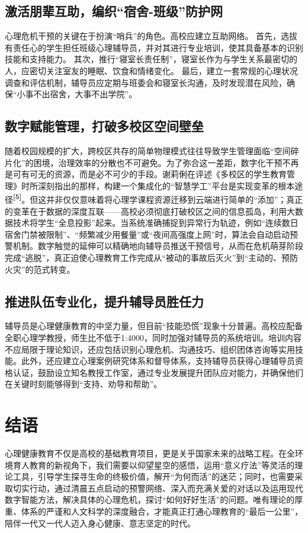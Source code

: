 \documentclass[a4paper,12pt]{ctexart}
\newcommand{\upcite}[1]{\textbf{\textsuperscript{[#1]}}}
\begin{document}
\subsection{激活朋辈互助，编织“宿舍-班级”防护网}
心理危机干预的关键在于扮演“哨兵”的角色。高校应建立互助网络。
首先，选拔有责任心的学生担任班级心理辅导员，并对其进行专业培训，使其具备基本的识别技能和支持能力。
其次，推行“寝室长责任制”，寝室长作为与学生关系最密切的人，应密切关注室友的睡眠、饮食和情绪变化。
最后，建立一套常规的心理状况调查和评估机制，辅导员应定期与班委会和寝室长沟通，及时发现潜在风险，确保“小事不出宿舍，大事不出学院”。

\subsection{数字赋能管理，打破多校区空间壁垒}
随着校园规模的扩大，跨校区共存的简单物理模式往往导致学生管理面临“空间碎片化”的困境，治理效率的分散也不可避免。为了弥合这一差距，数字化干预不再是可有可无的资源，而是必不可少的手段。谢莉俐在评述《多校区的学生教育管理》时所深刻指出的那样，构建一个集成化的“智慧学工”平台是实现变革的根本途径\upcite{5}。但这并非仅仅意味着将心理学课程资源迁移到云端进行简单的“添加”；真正的变革在于数据的深度互联——高校必须彻底打破校区之间的信息孤岛，利用大数据技术将学生“全息投影”起来。当系统准确捕捉到异常行为轨迹，例如“连续数日宿舍门禁被限制”、“频繁减少用餐量”或“夜间高强度上网”时，算法会自动启动预警机制。数字触觉的延伸可以精确地向辅导员推送干预信号，从而在危机萌芽阶段完成“逃脱”，真正迫使心理教育工作完成从“被动的事故后灭火”到“主动的、预防火灾”的范式转变。

\subsection{推进队伍专业化，提升辅导员胜任力}
辅导员是心理健康教育的中坚力量，但目前“技能恐慌”现象十分普遍。高校应配备全职心理学教授，师生比不低于1:4000，同时加强对辅导员的系统培训。培训内容不应局限于理论知识，还应包括识别心理危机、沟通技巧、组织团体咨询等实用技能。此外，还应建立心理案例研究体系和督导体系，支持辅导员获得心理辅导员资格认证，鼓励设立知名教授工作室，通过专业发展提升团队应对能力，并确保他们在关键时刻能够得到“支持、劝导和帮助”。

\section{结语}
心理健康教育不仅是高校的基础教育项目，更是关乎国家未来的战略工程。在全环境育人教育的新视角下，我们需要以仰望星空的感悟，运用“意义疗法”等灵活的理论工具，引导学生探寻生命的终极价值，解开“为何而活”的迷茫；同时，也需要采取切实行动，通过清晨五点启动的预警网络、深入而充满关爱的对话以及运用现代数字智能方法，解决具体的心理危机，探讨“如何好好生活”的问题。唯有理论的厚重、体系的严谨和人文科学的深度融合，才能真正打通心理教育的“最后一公里”，陪伴一代又一代人迈入身心健康、意志坚定的时代。
\end{document}
